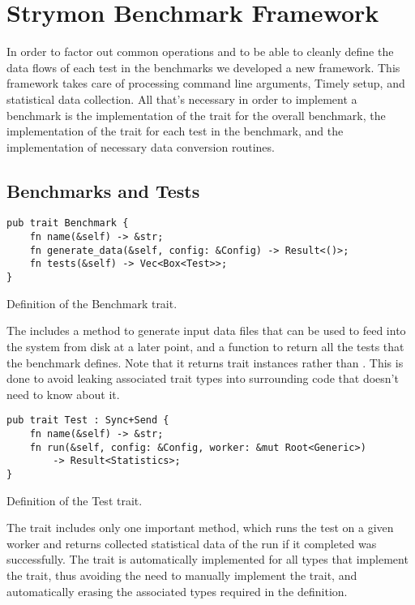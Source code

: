 \section{Strymon Benchmark Framework}\label{section:framework}
In order to factor out common operations and to be able to cleanly define the data flows of each test in the benchmarks we developed a new framework. This framework takes care of processing command line arguments, Timely setup, and statistical data collection. All that's necessary in order to implement a benchmark is the implementation of the  trait for the overall benchmark, the implementation of the  trait for each test in the benchmark, and the implementation of necessary data conversion routines.

\subsection{Benchmarks and Tests}
\begin{listing}[H]
\begin{verbatim}
pub trait Benchmark {
    fn name(&self) -> &str;
    fn generate_data(&self, config: &Config) -> Result<()>;
    fn tests(&self) -> Vec<Box<Test>>;
}
\end{verbatim}
  \caption{Definition of the Benchmark trait.}
  \label{lst:benchmark-trait}
\end{listing}

The  includes a method to generate input data files that can be used to feed into the system from disk at a later point, and a function to return all the tests that the benchmark defines. Note that it returns  trait instances rather than . This is done to avoid leaking associated trait types into surrounding code that doesn't need to know about it.

\begin{listing}[H]
\begin{verbatim}
pub trait Test : Sync+Send {
    fn name(&self) -> &str;
    fn run(&self, config: &Config, worker: &mut Root<Generic>)
        -> Result<Statistics>;
}
\end{verbatim}
  \caption{Definition of the Test trait.}
  \label{lst:test-trait}
\end{listing}

The  trait includes only one important method, which runs the test on a given worker and returns collected statistical data of the run if it completed was successfully. The  trait is automatically implemented for all types that implement the  trait, thus avoiding the need to manually implement the  trait, and automatically erasing the associated types required in the  definition.

